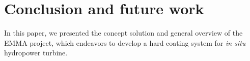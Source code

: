 \section{Conclusion and future work}


In this paper, we presented the concept solution and general overview of the
EMMA project, which endeavors to develop a hard coating system for \textit{in
situ} hydropower turbine.

